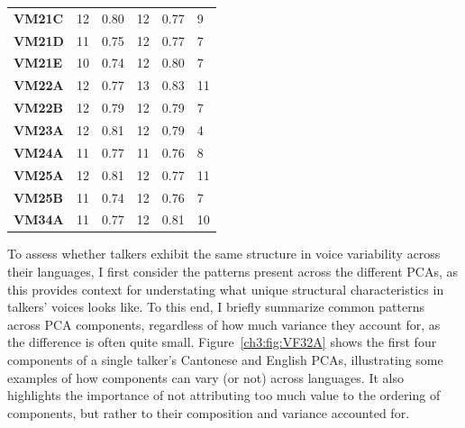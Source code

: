 \begin{table}[htbp]
\begin{tabular}{llllll}
    \textbf{VM21C} & 12 & 0.80 & 12 & 0.77 & 9 \\
    \textbf{VM21D} & 11 & 0.75 & 12 & 0.77 & 7 \\
    \textbf{VM21E} & 10 & 0.74 & 12 & 0.80 & 7 \\
    \textbf{VM22A} & 12 & 0.77 & 13 & 0.83 & 11 \\
    \textbf{VM22B} & 12 & 0.79 & 12 & 0.79 & 7 \\
    \textbf{VM23A} & 12 & 0.81 & 12 & 0.79 & 4 \\
    \textbf{VM24A} & 11 & 0.77 & 11 & 0.76 & 8 \\
    \textbf{VM25A} & 12 & 0.81 & 12 & 0.77 & 11 \\
    \textbf{VM25B} & 11 & 0.74 & 12 & 0.76 & 7 \\
    \textbf{VM34A} & 11 & 0.77 & 12 & 0.81 & 10 \\
    \bottomrule
    \end{tabular}
\end{table}

To assess whether talkers exhibit the same structure in voice variability across their languages, I first consider the patterns present across the different PCAs, as this provides context for understating what unique structural characteristics in talkers' voices looks like. To this end, I briefly summarize common patterns across PCA components, regardless of how much variance they account for, as the difference is often quite small. Figure~\ref{ch3:fig:VF32A} shows the first four components of a single talker's Cantonese and English PCAs, illustrating some examples of how components can vary (or not) across languages. It also highlights the importance of not attributing too much value to the ordering of components, but rather to their composition and variance accounted for.

